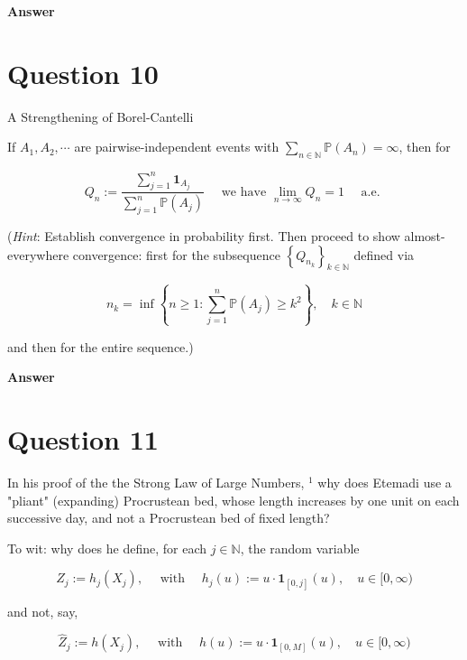\documentclass[letterpaper]{article}
\begin{document}
		\textbf{Answer}
		
		\clearpage
		
		\section{Question 10}
		{\color{deepred} A Strengthening of Borel-Cantelli}
		
		 If $A_{1}, A_{2}, \cdots$ are pairwise-independent events with $\sum_{n \in \mathbb{N}} \mathbb{P}\left(A_{n}\right)=\infty$, then for
		
		$$
		Q_{n}:=\frac{\sum_{j=1}^{n} \mathbf{1}_{A_{j}}}{\sum_{j=1}^{n} \mathbb{P}\left(A_{j}\right)} \quad \text { we have } \lim _{n \rightarrow \infty} Q_{n}=1 \quad \text { a.e. }
		$$
		
		(\emph{Hint}: Establish convergence in probability first. Then proceed to show almost-everywhere convergence: first for the subsequence $\left\{Q_{n_{k}}\right\}_{k \in \mathbb{N}}$ defined via
		
		$$
		n_{k}=\inf \left\{n \geq 1: \sum_{j=1}^{n} \mathbb{P}\left(A_{j}\right) \geq k^{2}\right\}, \quad k \in \mathbb{N}
		$$
		
		and then for the entire sequence.)
		
		\textbf{Answer}
		
		\clearpage
		
		\section{Question 11}
		
		In his proof of the the Strong Law of Large Numbers, ${ }^{1}$ why does Etemadi use a "pliant" (expanding) Procrustean bed, whose length increases by one unit on each successive day, and not a Procrustean bed of fixed length?
		
		To wit: why does he define, for each $j \in \mathbb{N}$, the random variable
		
		
		\begin{equation*}
			Z_{j}:=h_{j}\left(X_{j}\right), \quad \text { with } \quad h_{j}(u):=u \cdot \mathbf{1}_{[0, j]}(u), \quad u \in[0, \infty) \tag{0.2}
		\end{equation*}
		
		
		and not, say,
		
		
		\begin{equation*}
			\widehat{Z}_{j}:=h\left(X_{j}\right), \quad \text { with } \quad h(u):=u \cdot \mathbf{1}_{[0, M]}(u), \quad u \in[0, \infty) \tag{0.3}
		\end{equation*}
		
\end{document}
